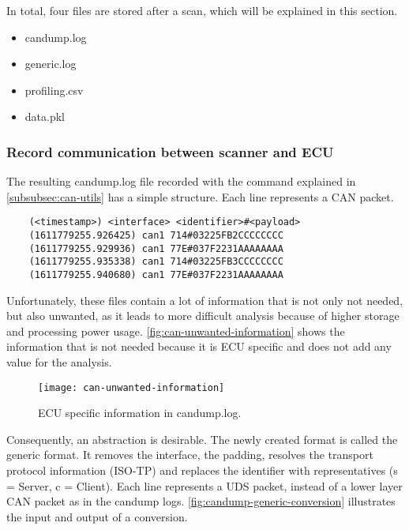 In total, four files are stored after a scan, which will be explained in this section.

\begin{itemize}
    \item candump.log
    \item generic.log
    \item profiling.csv
    \item data.pkl
\end{itemize}

\subsubsection{Record communication between scanner and ECU}

The resulting candump.log file recorded with the command explained in \autoref{subsubsec:can-utils} has a simple structure. Each line represents a CAN packet.

\begin{samepage}
\begin{verbatim}
    (<timestamp>) <interface> <identifier>#<payload>
    (1611779255.926425) can1 714#03225FB2CCCCCCCC
    (1611779255.929936) can1 77E#037F2231AAAAAAAA
    (1611779255.935338) can1 714#03225FB3CCCCCCCC
    (1611779255.940680) can1 77E#037F2231AAAAAAAA
\end{verbatim}
\end{samepage}

Unfortunately, these files contain a lot of information that is not only not needed, but also unwanted, as it leads to more difficult analysis because of higher storage and processing power usage. \autoref{fig:can-unwanted-information} shows the information that is not needed because it is ECU specific and does not add any value for the analysis.

\begin{figure}[H]
    \centering
    \texttt{[image: can-unwanted-information]}
    \caption{ECU specific information in candump.log.}
    \label{fig:can-unwanted-information}
\end{figure}

Consequently, an abstraction is desirable. The newly created format is called the generic format. It removes the interface, the padding, resolves the transport protocol information (ISO-TP) and replaces the identifier with representatives (s = Server, c = Client). Each line represents a UDS packet, instead of a lower layer CAN packet as in the candump logs. \autoref{fig:candump-generic-conversion} illustrates the input and output of a conversion.

